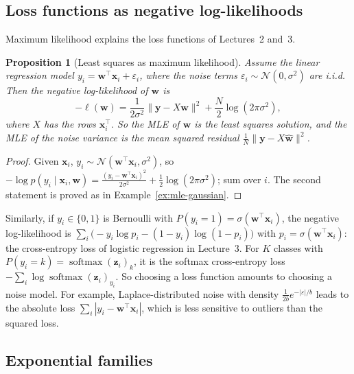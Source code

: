 \documentclass[11pt]{article}
\newcommand{\norm}[1]{\lVert #1 \rVert}
\theoremstyle{definition}
\theoremstyle{plain}
\newtheorem{proposition}[definition]{Proposition}
\theoremstyle{remark}
\DeclareMathOperator{\softmax}{softmax}
\begin{document}
\subsection{Loss functions as negative log-likelihoods}

Maximum likelihood explains the loss functions of Lectures~2 and~3.

\begin{proposition}[Least squares as maximum likelihood]\label{prop:ls-mle}
    Assume the linear regression model $y_i = \mathbf{w}^\top\mathbf{x}_i + \varepsilon_i$, where the noise terms $\varepsilon_i \sim \mathcal{N}(0, \sigma^2)$ are i.i.d. Then the negative log-likelihood of $\mathbf{w}$ is
    \[-\ell(\mathbf{w}) = \frac{1}{2\sigma^2}\norm{\mathbf{y} - X\mathbf{w}}^2 + \frac{N}{2}\log(2\pi\sigma^2),\]
    where $X$ has the rows $\mathbf{x}_i^\top$. So the MLE of $\mathbf{w}$ is the least squares solution, and the MLE of the noise variance is the mean squared residual $\frac{1}{N}\norm{\mathbf{y} - X\hat{\mathbf{w}}}^2$.
\end{proposition}

\begin{proof}
    Given $\mathbf{x}_i$, $y_i \sim \mathcal{N}(\mathbf{w}^\top\mathbf{x}_i, \sigma^2)$, so $-\log p(y_i \mid \mathbf{x}_i, \mathbf{w}) = \frac{(y_i - \mathbf{w}^\top\mathbf{x}_i)^2}{2\sigma^2} + \frac{1}{2}\log(2\pi\sigma^2)$; sum over $i$. The second statement is proved as in Example~\ref{ex:mle-gaussian}.
\end{proof}

Similarly, if $y_i \in \{0, 1\}$ is Bernoulli with $P(y_i = 1) = \sigma(\mathbf{w}^\top\mathbf{x}_i)$, the negative log-likelihood is $\sum_i \big(-y_i\log p_i - (1 - y_i)\log(1 - p_i)\big)$ with $p_i = \sigma(\mathbf{w}^\top\mathbf{x}_i)$: the cross-entropy loss of logistic regression in Lecture~3. For $K$ classes with $P(y_i = k) = \softmax(\mathbf{z}_i)_k$, it is the softmax cross-entropy loss $-\sum_i \log\softmax(\mathbf{z}_i)_{y_i}$. So choosing a loss function amounts to choosing a noise model. For example, Laplace-distributed noise with density $\frac{1}{2b}e^{-|\varepsilon|/b}$ leads to the absolute loss $\sum_i |y_i - \mathbf{w}^\top\mathbf{x}_i|$, which is less sensitive to outliers than the squared loss.

\subsection{Exponential families}\label{sec:exp-family}
\end{document}
